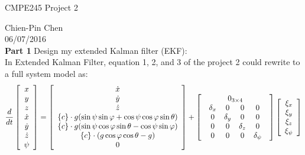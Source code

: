 \documentclass[10pt,letterpaper]{article}
\begin{document}
\begin{center}
CMPE245 Project 2
\end{center}
Chien-Pin Chen\\
06/07/2016\\

\noindent \textbf{Part 1} Design my extended Kalman filter (EKF):\\
In Extended Kalman Filter, equation 1, 2, and 3 of the project 2 could rewrite to a full system model as:
\begin{equation}
	\frac{d}{{dt}}\left[ {\begin{array}{*{20}c}
	   x  \\
	   y  \\
	   z  \\
	   {\dot x}  \\
	   {\dot y}  \\
	   {\dot z}  \\
	   \psi   \\
	\end{array}} \right] = \left[ {\begin{array}{*{20}c}
	   {\dot x}  \\
	   {\dot y}  \\
	   {\dot z}  \\
	   {\{ c\}  \cdot g(\sin \psi \sin \varphi  + \cos \psi \cos \varphi \sin \theta )}  \\
	   {\{ c\}  \cdot g(\sin \psi \cos \varphi \sin \theta  - \cos \psi \sin \varphi )}  \\
	   {\{ c\}  \cdot (g\cos \varphi \cos \theta  - g)}  \\
	   0  \\
	\end{array}} \right] + \left[ {\begin{array}{*{20}c}
	   {0_{3 \times 4} }  \\
	   {\begin{array}{*{20}c}
	   {\delta _x } & 0 & 0 & 0  \\
	   0 & {\delta _y } & 0 & 0  \\
	   0 & 0 & {\delta _z } & 0  \\
	   0 & 0 & 0 & {\delta _\psi  }  \\
	\end{array}}  \\
	\end{array}} \right]\left[ {\begin{array}{*{20}c}
	   {\xi _x }  \\
	   {\xi _y }  \\
	   {\xi _z }  \\
	   {\xi _\psi  }  \\
	\end{array}} \right]
\end{equation}
\end{document}
